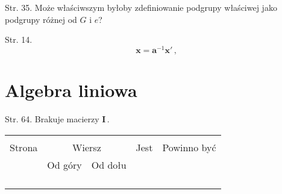 \documentclass[a4paper,11pt]{article}
\begin{document}
\vspace{\spaceTwo}













Str. 35. Może właściwszym byłoby zdefiniowanie podgrupy
  właściwej jako podgrupy różnej od $G$ i $e$?

Str. 14.
$$ \mathbf{ x } = \mathbf{ a }^{ -1 } \mathbf{ x }' \, ,$$


\vspace{\spaceTwo}










\newpage
\section{Algebra liniowa}

\vspace{\spaceTwo}








Str. 64. Brakuje macierzy $\mathbf{I} \, .$




\begin{center}

  \begin{tabular}{|c|c|c|c|c|}
    \hline
    & \multicolumn{2}{c|}{} & & \\
    Strona & \multicolumn{2}{c|}{Wiersz} & Jest
                              & Powinno być \\ \cline{2-3}
    & Od góry & Od dołu & & \\
    \hline
    & & & & \\
    & & & & \\
    & & & & \\
    & & & & \\
    \hline
  \end{tabular}

\end{center}
\end{document}
